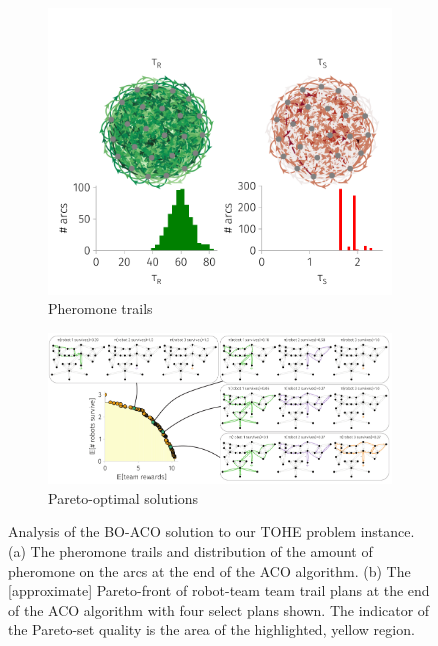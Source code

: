 \documentclass[fleqn,10pt,lineno]{wlpeerj}
\begin{document}
\begin{figure}[h!]
    \centering
    \begin{subfigure}[b]{0.59\textwidth}
    	\includegraphics[width=\textwidth]{pheremone.pdf}
	\caption{Pheromone trails} \label{fig:pheromone}
    \end{subfigure}
        \begin{subfigure}[b]{\textwidth}
    	\includegraphics[width=\textwidth]{real_pareto_front.pdf}
	\caption{Pareto-optimal solutions} \label{fig:pareto_front}
    \end{subfigure}
    \caption{Analysis of the BO-ACO solution to our TOHE problem instance. 
    (a) The pheromone trails and distribution of the amount of pheromone on the arcs at the end of the ACO algorithm. 
    (b) The [approximate] Pareto-front of robot-team team trail plans at the end of the ACO algorithm with four select plans shown. The indicator of the Pareto-set quality is the area of the highlighted, yellow region.
    }
\end{figure}
\end{document}
